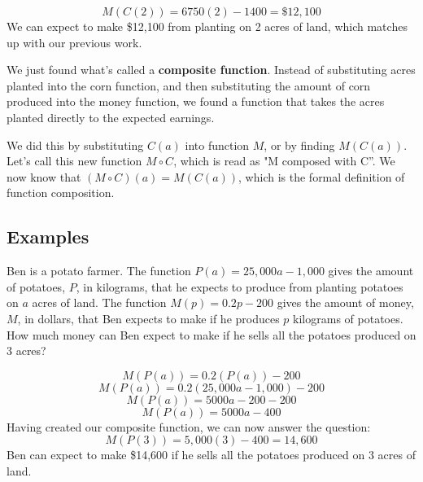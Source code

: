\documentclass{article}
\begin{document}
$$M(C(2)) = 6750(2) - 1400 = \$12,100$$
We can expect to make \$12,100 from planting on 2 acres of land, which matches up with our previous work. 

We just found what's called a \textbf{composite function}. Instead of substituting acres planted into the corn function, and then substituting the amount of corn produced into the money function, we found a function that takes the acres planted directly to the expected earnings. 

We did this by substituting $C(a)$ into function $M$, or by finding $M(C(a))$. Let's call this new function $M \circ C$, which is read as "M composed with C''. 
We now know that $(M \circ C)(a) = M(C(a))$, which is the formal definition of function composition. 
\subsection{Examples}
Ben is a potato farmer. The function $P(a) = 25,000a - 1,000$ gives the amount of potatoes, $P$, in kilograms, that he expects to produce from planting potatoes on $a$ acres of land. The function $M(p) = 0.2p - 200$ gives the amount of money, $M$, in dollars, that Ben expects to make if he produces $p$ kilograms of potatoes. How much money can Ben expect to make if he sells all the potatoes produced on 3 acres? 

$$M(P(a)) = 0.2(P(a)) - 200$$
$$M(P(a)) = 0.2(25,000a - 1,000) - 200$$
$$M(P(a)) = 5000a - 200 - 200$$
$$M(P(a)) = 5000a - 400$$
Having created our composite function, we can now answer the question: 
$$M(P(3)) = 5,000(3) - 400 = 14,600$$
Ben can expect to make \$14,600 if he sells all the potatoes produced on 3 acres of land.
\end{document}
